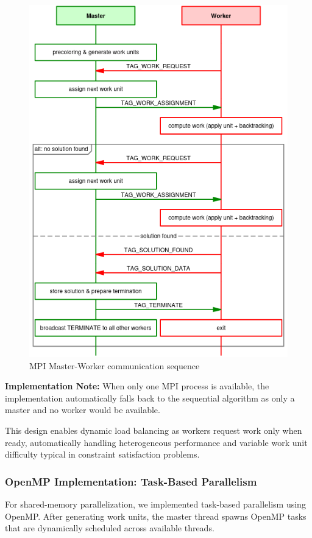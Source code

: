 \begin{figure}[htbp]
\centering
\includegraphics[width=0.9\linewidth]{imgs/mpi_msc.png}
\caption{MPI Master-Worker communication sequence}
\label{fig:mpi_sequence}
\end{figure}

\textbf{Implementation Note:} When only one MPI process is available, the implementation automatically falls back to the sequential algorithm as only a master and no worker would be available.

This design enables dynamic load balancing as workers request work only when ready, automatically handling heterogeneous performance and variable work unit difficulty typical in constraint satisfaction problems.


\subsubsection{OpenMP Implementation: Task-Based Parallelism}
\label{subsubsec:omp_implementation}
For shared-memory parallelization, we implemented task-based parallelism using OpenMP. After generating work units, the master thread spawns OpenMP tasks that are dynamically scheduled across available threads.

